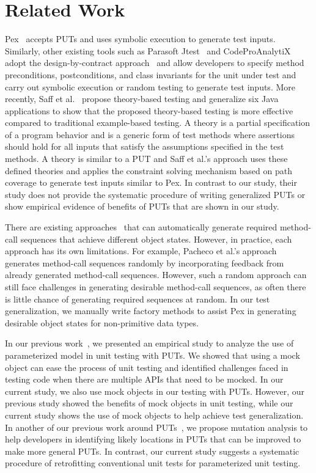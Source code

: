 \section{Related Work}
\label{sec:related}
\vspace*{2ex}
Pex~\cite{tillmann08:pex, tillmann05:parameterized, tillmann06:unit} accepts PUTs and uses symbolic execution to generate test inputs. Similarly, other existing tools such as Parasoft Jtest~\cite{jtest} and CodeProAnalytiX~\cite{codepro} adopt the design-by-contract approach~\cite{dbc} and allow developers to specify method preconditions, postconditions, and class invariants for the unit under test and carry out symbolic execution or random testing to generate test inputs. More recently, Saff et al.~\cite{ernst:theory} propose theory-based testing and generalize six Java applications to show that the proposed theory-based testing is more effective compared to traditional example-based testing. A theory is a partial specification of a program behavior and is a generic form of test methods where assertions should hold for all inputs that satisfy the assumptions specified in the test methods. A theory is similar to a PUT and Saff et al.'s approach uses these defined theories and applies the constraint solving mechanism based on path coverage to generate test inputs similar to Pex. In contrast to our study, their study does not provide the systematic procedure of writing generalized PUTs or show empirical evidence of benefits of PUTs that are shown in our study. 

There are existing approaches~\cite{pacheco:feedback, csallner:jcrasher, khurshid:symbolic} that can automatically generate required method-call sequences that achieve different object states. However, in practice, each approach has its own limitations. For example, Pacheco et al.'s approach~\cite{pacheco:feedback} generates method-call sequences randomly by incorporating feedback from already generated method-call sequences. However, such a random approach can still face challenges in generating desirable method-call sequences, as often there is little chance of generating required sequences at random. In our test generalization, we manually write factory methods to assist Pex in generating desirable object states for non-primitive data types.

In our previous work~\cite{marri09:empirical}, we presented an empirical study to analyze the use of parameterized model in unit testing with PUTs. We showed that using a mock object can ease the process of unit testing and identified challenges faced in testing code when there are multiple APIs that need to be mocked. In our current study, we also use mock objects in our testing with PUTs. However, our previous study showed the benefits of mock objects in unit testing, while our current study shows the use of mock objects to help achieve test generalization. In another of our previous work around PUTs~\cite{xie09:mutation}, we propose mutation analysis to help developers in identifying likely locations in PUTs that can be improved to make more general PUTs. In contrast, our current study suggests a systematic procedure of retrofitting conventional unit tests for parameterized unit testing.